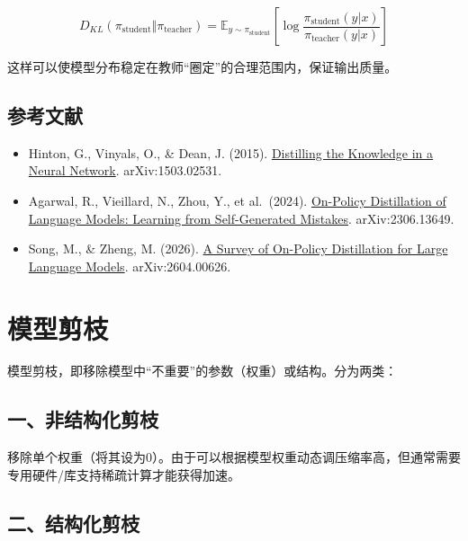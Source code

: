 \[
D_{KL}(\pi_{\mathrm{student}} \Vert \pi_{\mathrm{teacher}}) = \mathbb{E}_{y \sim \pi_{\mathrm{student}}}\left[\log \frac{\pi_{\mathrm{student}}(y|x)}{\pi_{\mathrm{teacher}}(y|x)}\right]
\]

这样可以使模型分布稳定在教师``圈定''的合理范围内，保证输出质量。

\hypertarget{ux53c2ux8003ux6587ux732e-89}{%
\subsection{参考文献}\label{ux53c2ux8003ux6587ux732e-89}}

\vspace{0.25em}
\begin{itemize}
\tightlist
\item
  Hinton, G., Vinyals, O., \& Dean, J. (2015). \href{https://arxiv.org/abs/1503.02531}{Distilling the Knowledge in a Neural Network}. arXiv:1503.02531.
\item
  Agarwal, R., Vieillard, N., Zhou, Y., et al.~(2024). \href{https://arxiv.org/abs/2306.13649}{On-Policy Distillation of Language Models: Learning from Self-Generated Mistakes}. arXiv:2306.13649.
\item
  Song, M., \& Zheng, M. (2026). \href{https://arxiv.org/abs/2604.00626}{A Survey of On-Policy Distillation for Large Language Models}. arXiv:2604.00626.
\end{itemize}

\clearpage

\hypertarget{ux6a21ux578bux526aux679d}{%
\section{模型剪枝}\label{ux6a21ux578bux526aux679d}}

模型剪枝，即移除模型中``不重要''的参数（权重）或结构。分为两类：

\hypertarget{ux4e00ux975eux7ed3ux6784ux5316ux526aux679d}{%
\subsection{一、非结构化剪枝}\label{ux4e00ux975eux7ed3ux6784ux5316ux526aux679d}}

移除单个权重（将其设为0）。由于可以根据模型权重动态调压缩率高，但通常需要专用硬件/库支持稀疏计算才能获得加速。

\hypertarget{ux4e8cux7ed3ux6784ux5316ux526aux679d}{%
\subsection{二、结构化剪枝}\label{ux4e8cux7ed3ux6784ux5316ux526aux679d}}

